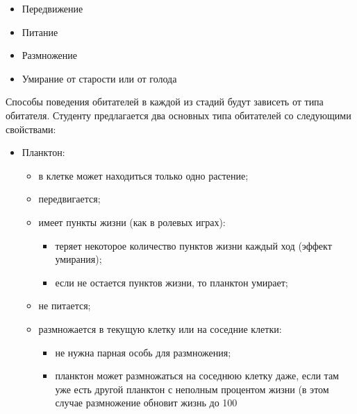 \documentclass[a4paper,12pt]{article}
\begin{document}
\begin{itemize}
\item Передвижение
\item Питание
\item Размножение
\item Умирание от старости или от голода
\end{itemize}

Способы поведения обитателей в каждой из стадий будут зависеть от типа
обитателя. Студенту предлагается два основных типа обитателей со
следующими свойствами:

\begin{itemize}
\item Планктон:

  \begin{itemize}
  \item в клетке может находиться только одно растение;
  \item передвигается;
  \item имеет пункты жизни (как в ролевых играх):
    \begin{itemize}
    \item теряет некоторое количество пунктов жизни каждый ход
      (эффект умирания);
    \item если не остается пунктов жизни, то планктон умирает;
    \end{itemize}
  \item не питается;
  \item размножается в текущую клетку или на соседние клетки:
    \begin{itemize}
    \item не нужна парная особь для размножения;
    \item планктон может размножаться на соседнюю клетку даже, если
      там уже есть другой планктон с неполным процентом жизни (в этом
      случае размножение обновит жизнь до 100%
    \end{itemize}
  \end{itemize}


\end{itemize}
\end{document}
